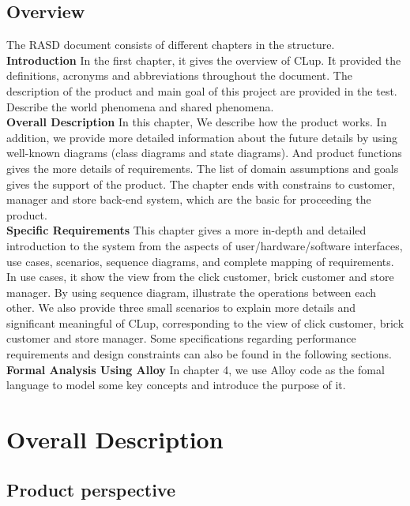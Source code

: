 \documentclass[a4paper,12pt]{report}
\begin{document}
\section{Overview}
The RASD document consists of different chapters in the structure.\\

\textbf{Introduction}  In the first chapter, it gives the overview of CLup. It provided the definitions, acronyms and abbreviations throughout the document. The description of the product and main goal of this project are provided in the test. Describe the world phenomena and shared phenomena.
\\


\textbf{Overall Description} In this chapter, We describe how the product works. In addition, we provide more detailed information about the future details by using well-known diagrams (class diagrams and state diagrams). And product functions gives the more details of requirements. The list of domain assumptions and goals gives the support of the product.  The chapter ends with constrains to customer, manager and store back-end system, which are the basic for proceeding the product.
\\

\textbf{Specific Requirements} This chapter gives a more in-depth and detailed introduction to the system from the aspects of user/hardware/software interfaces, use cases, scenarios, sequence diagrams, and complete mapping of requirements. In use cases, it show the view from the click customer, brick customer and store manager. By using sequence diagram, illustrate the operations between each other. We also provide three small scenarios to explain more details and significant meaningful of CLup, corresponding to the view of click customer, brick customer and store manager. Some specifications regarding performance requirements and design constraints can also be found in the following sections.\\

\textbf{Formal Analysis Using Alloy} In chapter 4, we use Alloy code as the fomal language to model some key concepts and introduce the purpose of it.\\


\chapter{Overall Description} \label{C2:OverallDescription}
\section{Product perspective}
\end{document}
